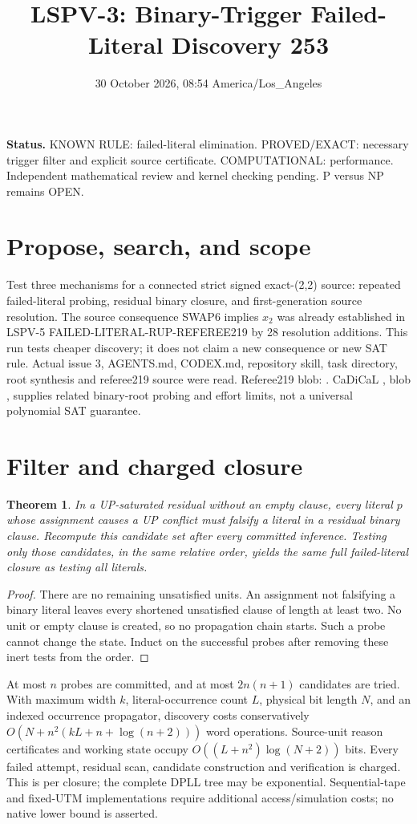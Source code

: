 \documentclass[11pt]{article}
\title{LSPV-3: Binary-Trigger Failed-Literal Discovery 253}
\date{30 October 2026, 08:54 America/Los\_Angeles}
\newtheorem{theorem}{Theorem}
\begin{document}
\maketitle
\noindent\textbf{Status.} KNOWN RULE: failed-literal elimination. PROVED/EXACT: necessary trigger filter and explicit source certificate. COMPUTATIONAL: performance. Independent mathematical review and kernel checking pending. P versus NP remains OPEN.

\section{Propose, search, and scope}
Test three mechanisms for a connected strict signed exact-(2,2) source: repeated failed-literal probing, residual binary closure, and first-generation source resolution. The source consequence SWAP6 implies $x_2$ was already established in LSPV-5 FAILED-LITERAL-RUP-REFEREE219 by 28 resolution additions. This run tests cheaper discovery; it does not claim a new consequence or new SAT rule. Actual issue 3, AGENTS.md, CODEX.md, repository skill, task directory, root synthesis and referee219 source were read. Referee219 blob: . CaDiCaL , blob , supplies related binary-root probing and effort limits, not a universal polynomial SAT guarantee.

\section{Filter and charged closure}
\begin{theorem}
In a UP-saturated residual without an empty clause, every literal $p$ whose assignment causes a UP conflict must falsify a literal in a residual binary clause. Recompute this candidate set after every committed inference. Testing only those candidates, in the same relative order, yields the same full failed-literal closure as testing all literals.
\end{theorem}
\begin{proof}
There are no remaining unsatisfied units. An assignment not falsifying a binary literal leaves every shortened unsatisfied clause of length at least two. No unit or empty clause is created, so no propagation chain starts. Such a probe cannot change the state. Induct on the successful probes after removing these inert tests from the order.
\end{proof}
At most $n$ probes are committed, and at most $2n(n+1)$ candidates are tried. With maximum width $k$, literal-occurrence count $L$, physical bit length $N$, and an indexed occurrence propagator, discovery costs conservatively $O(N+n^2(kL+n+\log(n+2)))$ word operations. Source-unit reason certificates and working state occupy $O((L+n^2)\log(N+2))$ bits. Every failed attempt, residual scan, candidate construction and verification is charged. This is per closure; the complete DPLL tree may be exponential. Sequential-tape and fixed-UTM implementations require additional access/simulation costs; no native lower bound is asserted.
\end{document}
